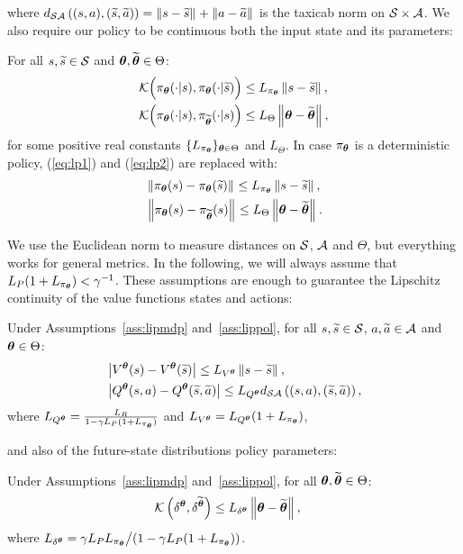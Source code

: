 %
\noindent where $d_{\mathcal{S}\mathcal{A}}\left((s,a),(\widetilde{s},\widetilde{a})\right) = \left\|s-\widetilde{s}\right\|_{} + \left\|a-\widetilde{a}\right\|_{}$ is the taxicab norm on $\mathcal{S}\times\mathcal{A}$.
We also require our policy to be continuous both \wrt the input state and its parameters:
%
\begin{assumption}\label{ass:lippol}
	For all $s,\widetilde{s}\in\mathcal{S}$ and $\boldsymbol{\theta},\widetilde{\boldsymbol{\theta}}\in\Theta$:
	\begin{align}
	&\mathcal{K}\Big(\pi_{\boldsymbol{\theta}}(\cdot|s),\pi_{\boldsymbol{\theta}}(\cdot|\widetilde{s})\Big) \leq L_{\pi_{\boldsymbol{\theta}}}\left\|s-\widetilde{s}\right\|_{}, \label{eq:lp1}\\
	&\mathcal{K}\Big(\pi_{\boldsymbol{\theta}}(\cdot|s), \pi_{\widetilde{\boldsymbol{\theta}}}(\cdot|s)\Big) \leq L_{\Theta}\left\|\boldsymbol{\theta}-\widetilde{\boldsymbol{\theta}}\right\|_{}, \label{eq:lp2}
	\end{align}
	for some positive real constants $\{L_{\pi_{\boldsymbol{\theta}}}\}_{\boldsymbol{\theta}\in\Theta}$ and $L_{\Theta}$. In case $\pi_{\boldsymbol{\theta}}$ is a deterministic policy, (\ref{eq:lp1}) and (\ref{eq:lp2}) are replaced with:
	\begin{align}
	&\left\|\pi_{\boldsymbol{\theta}}(s) - \pi_{\boldsymbol{\theta}}(\widetilde{s})\right\|_{} \leq L_{\pi_{\boldsymbol{\theta}}}\left\|s-\widetilde{s}\right\|_{}, \\
	&\left\|\pi_{\boldsymbol{\theta}}(s) - \pi_{\widetilde{\boldsymbol{\theta}}}(s)\right\|_{} \leq L_{\Theta}\left\|\boldsymbol{\theta}-\widetilde{\boldsymbol{\theta}}\right\|_{}.
	\end{align}
\end{assumption}
%
\noindent We use the Euclidean norm to measure distances on $\mathcal{S}$, $\mathcal{A}$ and $\Theta$, but everything works for general metrics.
In the following, we will always assume that ${L_{P}(1+L_{\pi_{\boldsymbol{\theta}}}) < \gamma^{-1}}$.
These assumptions are enough to guarantee the Lipschitz continuity of the value functions \wrt states and actions:
%
\begin{lemma}\label{lem:lipval}
	Under Assumptions~\ref{ass:lipmdp} and~\ref{ass:lippol}, for all $s,\widetilde{s}\in\mathcal{S}$, $a,\widetilde{a}\in\mathcal{A}$ and $\boldsymbol{\theta}\in\Theta$:
	\begin{align}
	&\left|V^{\boldsymbol{\theta}}(s) - V^{\boldsymbol{\theta}}(\widetilde{s})\right| \leq L_{V^{\boldsymbol{\theta}}}\left\|s-\widetilde{s}\right\|_{}, \\
	&\left|Q^{\boldsymbol{\theta}}(s,a) - Q^{\boldsymbol{\theta}}(\widetilde{s},\widetilde{a})\right| \leq L_{Q^{\boldsymbol{\theta}}}d_{\mathcal{S}\mathcal{A}}\left((s,a),(\widetilde{s},\widetilde{a})\right),
	\end{align}
	where $L_{Q^{\boldsymbol{\theta}}} = \frac{L_{R}}{1-\gamma L_{P}(1+L_{\pi_{\boldsymbol{\theta}}})}$ and $L_{V^{\boldsymbol{\theta}}} = L_{Q^{\boldsymbol{\theta}}}(1+L_{\pi_{\boldsymbol{\theta}}})$,
\end{lemma}
%
\noindent and also of the future-state distributions \wrt policy parameters:
%
\begin{lemma}\label{lem:lipfut}
	Under Assumptions~\ref{ass:lipmdp} and~\ref{ass:lippol}, for all $\boldsymbol{\theta},\widetilde{\boldsymbol{\theta}}\in\Theta$:
	\begin{align}
	&\mathcal{K}\left(\delta^{\boldsymbol{\theta}},\delta^{\widetilde{\boldsymbol{\theta}}}\right) \leq L_{\delta^{\boldsymbol{\theta}}}\left\|\boldsymbol{\theta}-\widetilde{\boldsymbol{\theta}}\right\|_{},
	\end{align}
	where $L_{\delta^{\boldsymbol{\theta}}} = {\gamma L_{P}L_{\pi_{\boldsymbol{\theta}}}}\big/{\left(1-\gamma L_{P}(1+L_{\pi_{\boldsymbol{\theta}}})\right)}$.
\end{lemma}

